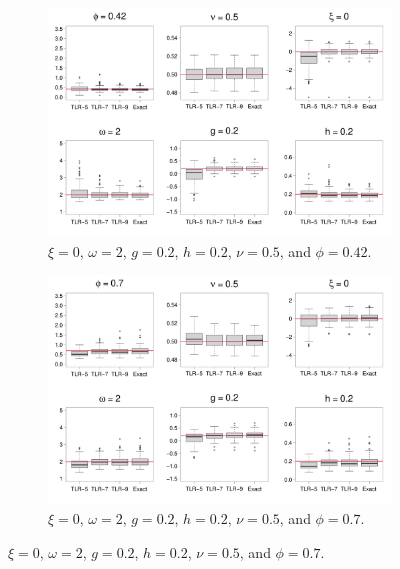 \documentclass[conference]{IEEEtran}
\begin{document}
\begin{figure}[htp!]
\centering
\begin{subfigure}{0.45\textwidth}%
  \centering
  \includegraphics[width=\linewidth]{./figures/boxplot_0.420000_0.200000_0.200000.pdf}
  \caption{ $\xi = 0$, $\omega = 2$, $g = 0.2$, $h = 0.2$, $\nu = 0.5$, and $\phi = 0.42$.}
\end{subfigure}%
\hspace{4mm}
\begin{subfigure}{0.45\textwidth}%
  \centering
  \includegraphics[width=\linewidth]{./figures/boxplot_0.700000_0.200000_0.200000.pdf}
   \caption{  $\xi = 0$, $\omega = 2$, $g = 0.2$, $h = 0.2$, $\nu = 0.5$, and $\phi = 0.7$.}
\end{subfigure}


\end{figure}
\end{document}
